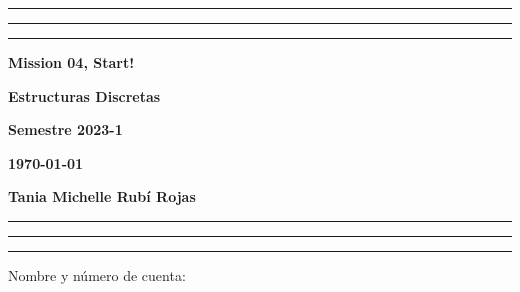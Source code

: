 \documentclass[12pt, a4paper]{exam}
\begin{document}
    \centering
    \hrule \hrule \hrule 
    \vspace{5mm}
    \begin{minipage}[c]{0.8\textwidth}
        \begin{center}
            {\large\textbf{Mission 04, Start!} \par
            \large \textbf{Estructuras Discretas} \par
            \large \textbf{Semestre 2023-1} \par
            \large \textbf{\today}	\par}
        \end{center}
    \end{minipage}

    \vspace{0.2in}
    \noindent
    \textbf{Tania Michelle Rubí Rojas}
    \vspace{2mm}
    \hrule \hrule \hrule 

    \vspace{5mm}
    \noindent
    Nombre y número de cuenta: \hrulefill\
\end{document}
